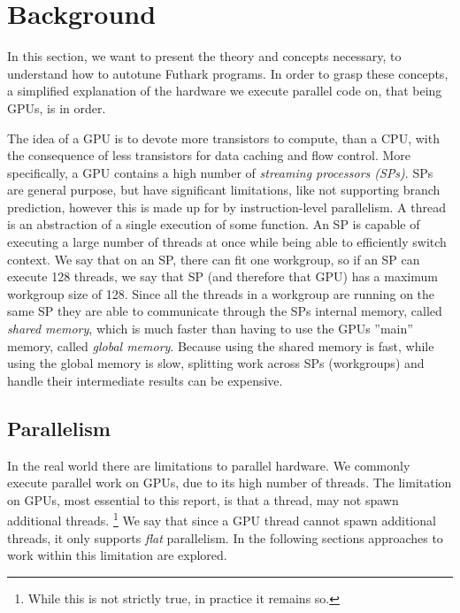 \section{Background}
\label{BabyGotBack}
\begin{comment}
A common way to increase computer performance, is to increase the capacity for 
parallelism. For practical usage, however, this is difficult to implement, due 
to low-level GPU-specific languages requiring domain specific knowledge to make 
full use of that capacity. A vast amount of work has gone into transforming 
high-level hardware-agnostic code into these low-level GPU-specific languages 
\cite{inc-flat}.  \end{comment}
In this section, we want to present the theory and concepts necessary, to
understand how to autotune Futhark programs. In order to grasp these concepts,
a simplified explanation of the hardware we execute parallel code on,
that being GPUs, is in order. 

The idea of a GPU is to devote more transistors to compute, than a CPU, with
the consequence of less transistors for data caching and flow control. More
specifically, a GPU contains a high number of \textit{streaming
processors (SPs)}. SPs are general purpose, but have significant
limitations, like not supporting branch prediction, however this is made up for 
by
instruction-level parallelism. A thread is an abstraction of a single execution 
of
some function. An SP is capable of executing a large number of threads at once 
while being
able to efficiently switch context. We say that on an SP, there can fit one 
workgroup,
so if an SP can execute 128 threads, we say that SP (and therefore that GPU) 
has a
maximum workgroup size of 128. Since all the threads in a workgroup are running
on the same SP they are able to communicate through the SPs
internal memory, called \textit{shared memory}, which is much faster than
having to use the GPUs ''main'' memory, called \textit{global memory}.
Because using the shared memory is fast, while using the global memory is
slow, splitting work across SPs (workgroups) and handle their intermediate
results can be expensive.

\subsection{Parallelism} In the real world there are limitations to parallel 
hardware. We
commonly execute parallel work on GPUs, due to its high number of threads. The
limitation on GPUs, most essential to this report, is that a thread, may not
spawn additional threads. \footnote{While this is not strictly true, in 
practice it remains
so.} We say that since a GPU thread cannot spawn additional threads, it only
supports \textit{flat} parallelism. In the following sections approaches to 
work within this limitation are explored.


